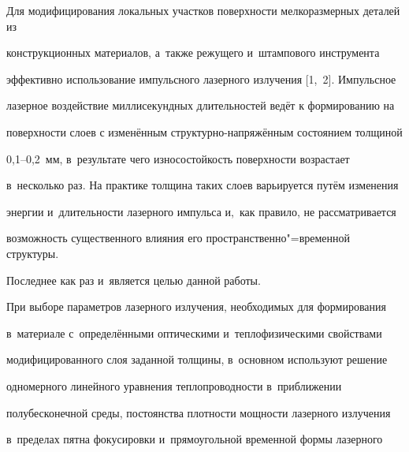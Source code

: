 \date{29.12.2007} 



\address{\samgtu}







\renewcommand{\baselinestretch}{.95}

\maketitle







Для модифицирования локальных участков поверхности мелкоразмерных деталей из 

конструкционных материалов, а~также режущего и~штампового инструмента 

эффективно использование импульсного лазерного излучения [1,~2]. Импульсное 

лазерное воздействие миллисекундных длительностей ведёт к формированию на 

поверхности слоев с изменённым структурно-напряжённым состоянием толщиной 

0,1--0,2~мм, в~результате чего износостойкость поверхности возрастает 

в~несколько раз. На практике толщина таких слоев варьируется путём изменения 

энергии и~длительности лазерного импульса и,~как правило, не рассматривается 

возможность существенного влияния его пространственно"=временной структуры. 

Последнее как раз и~является целью данной работы.



При выборе параметров лазерного излучения, необходимых для формирования 

в~материале с~определёнными оптическими и~теплофизическими свойствами 

модифицированного слоя заданной толщины, в~основном используют решение 

одномерного линейного уравнения теплопроводности в~приближении 

полубесконечной среды, постоянства плотности мощности лазерного излучения 

в~пределах пятна фокусировки и~прямоугольной временной формы лазерного 

